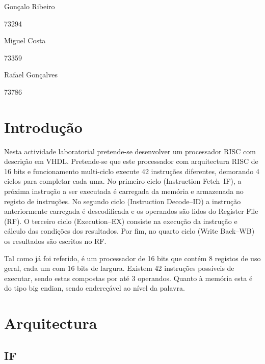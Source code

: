\documentclass[a4paper]{article}
\begin{document}
	
	
	
	\trSetAuthors
		{
		Gonçalo Ribeiro
		
		73294
		}{
		Miguel Costa
		
		73359
		}{
		Rafael Gonçalves
		
		73786
		}
	
	
	\trMakeCover
	
	\tableofcontents
	\pagebreak
	
	\section{Introdução}
	
		Nesta actividade laboratorial pretende-se desenvolver um processador \textmu RISC com descrição em VHDL. Pretende-se que este processador com arquitectura RISC de 16 bits e funcionamento multi-ciclo execute 42 instruções diferentes, demorando 4 ciclos para completar cada uma. No primeiro ciclo (Instruction Fetch--IF), a próxima instrução a ser executada é carregada da memória e armazenada no registo de instruções. No segundo ciclo (Instruction Decode--ID) a instrução anteriormente carregada é descodificada e os operandos são lidos do Register File (RF). O terceiro ciclo (Execution--EX) consiste na execução da instrução e cálculo das condições dos resultados. Por fim, no quarto ciclo (Write Back--WB) os resultados são escritos no RF.
	
		Tal como já foi referido, é um processador de 16 bits que contém 8 registos de uso geral, cada um com 16 bits de largura. Existem 42 instruções possíveis de executar, sendo estas compostas por até 3 operandos. Quanto à memória esta é do tipo big endian, sendo endereçável ao nível da palavra.
	
	
	\section{Arquitectura}
	
		\subsection{IF}
\end{document}
